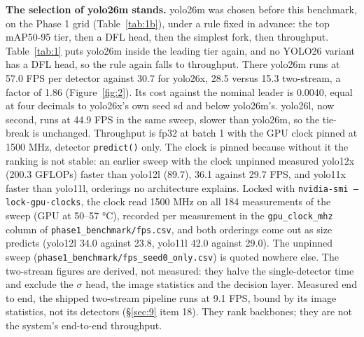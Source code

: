 \documentclass[10pt]{article}
\begin{document}
\textbf{The selection of yolo26m stands.} yolo26m was chosen before this benchmark, on the Phase 1 grid (Table~\ref{tab:1b}), under a rule fixed in advance: the top mAP50-95 tier, then a DFL head, then the simplest fork, then throughput. Table~\ref{tab:1} puts yolo26m inside the leading tier again, and no YOLO26 variant has a DFL head, so the rule again falls to throughput. There yolo26m runs at 57.0 FPS per detector against 30.7 for yolo26x, 28.5 versus 15.3 two-stream, a factor of 1.86 (Figure~\ref{fig:2}). Its cost against the nominal leader is 0.0040, equal at four decimals to yolo26x's own seed sd and below yolo26m's. yolo26l, now second, runs at 44.9 FPS in the same sweep, slower than yolo26m, so the tie-break is unchanged. Throughput is fp32 at batch 1 with the GPU clock pinned at 1500 MHz, detector \texttt{predict()} only. The clock is pinned because without it the ranking is not stable: an earlier sweep with the clock unpinned measured yolo12x (200.3 GFLOPs) faster than yolo12l (89.7), 36.1 against 29.7 FPS, and yolo11x faster than yolo11l, orderings no architecture explains. Locked with \texttt{nvidia-smi --lock-gpu-clocks}, the clock read 1500 MHz on all 184 measurements of the sweep (GPU at 50--57 °C), recorded per measurement in the \texttt{gpu\_\allowbreak{}clock\_\allowbreak{}mhz} column of \texttt{phase1\_\allowbreak{}benchmark/\allowbreak{}fps.csv}, and both orderings come out as size predicts (yolo12l 34.0 against 23.8, yolo11l 42.0 against 29.0). The unpinned sweep (\texttt{phase1\_\allowbreak{}benchmark/\allowbreak{}fps\_\allowbreak{}seed0\_\allowbreak{}only.csv}) is quoted nowhere else. The two-stream figures are derived, not measured: they halve the single-detector time and exclude the $\sigma$ head, the image statistics and the decision layer. Measured end to end, the shipped two-stream pipeline runs at 9.1 FPS, bound by its image statistics, not its detectors (\S\ref{sec:9} item 18). They rank backbones; they are not the system's end-to-end throughput.
\end{document}
